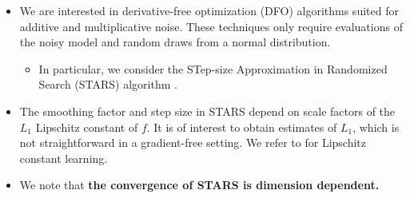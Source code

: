 \documentclass[11pt]{beamer}
\begin{document}
\begin{frame}

\begin{itemize}
 


\item We are interested in derivative-free optimization (DFO) algorithms suited for additive and multiplicative noise. These techniques only require evaluations of the noisy model and random draws from a normal distribution.

\begin{itemize}
	\item In particular, we consider the STep-size Approximation in Randomized Search (STARS) algorithm \footnotemark[1].
\end{itemize}





\item The smoothing factor and step size in STARS depend on scale factors of the $L_1$ Lipschitz constant of $f$. It is of interest to obtain estimates of $L_1$, which is not straightforward in a gradient-free setting. We refer to \footnotemark[2] \footnotemark[3] for Lipschitz constant learning.

\item We note that \textbf{the convergence of STARS is dimension dependent.}


\end{itemize}


\end{frame}
\end{document}
